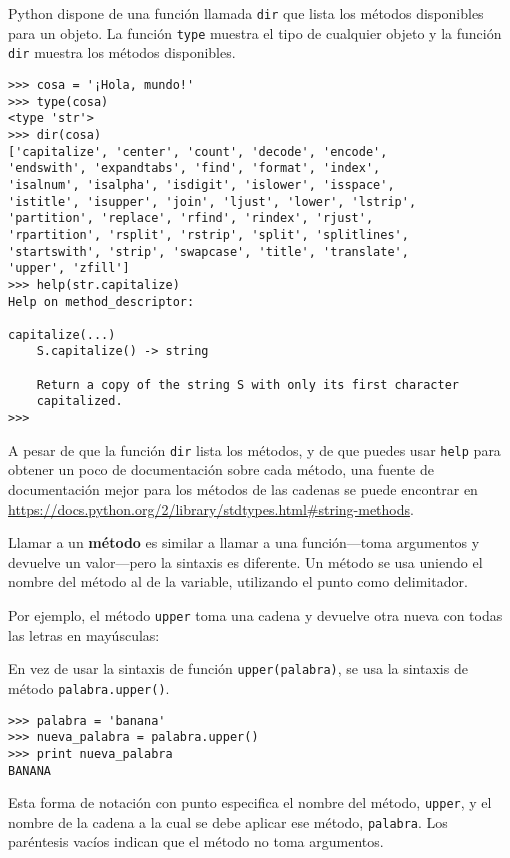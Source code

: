 Python dispone de una función llamada {\tt dir} que lista los métodos disponibles
para un objeto. La función {\tt type} muestra el tipo de cualquier objeto
y la función {\tt dir} muestra los métodos disponibles. 

\beforeverb
\begin{verbatim}
>>> cosa = '¡Hola, mundo!'
>>> type(cosa)
<type 'str'>
>>> dir(cosa)
['capitalize', 'center', 'count', 'decode', 'encode', 
'endswith', 'expandtabs', 'find', 'format', 'index', 
'isalnum', 'isalpha', 'isdigit', 'islower', 'isspace', 
'istitle', 'isupper', 'join', 'ljust', 'lower', 'lstrip', 
'partition', 'replace', 'rfind', 'rindex', 'rjust', 
'rpartition', 'rsplit', 'rstrip', 'split', 'splitlines', 
'startswith', 'strip', 'swapcase', 'title', 'translate', 
'upper', 'zfill']
>>> help(str.capitalize)
Help on method_descriptor:

capitalize(...)
    S.capitalize() -> string
    
    Return a copy of the string S with only its first character
    capitalized.
>>>
\end{verbatim}
\afterverb
%

A pesar de que la función {\tt dir} lista los métodos, y de que
puedes usar {\tt help} para obtener un poco de documentación sobre
cada método, una fuente de documentación mejor para los métodos de las cadenas
se puede encontrar en
\url{https://docs.python.org/2/library/stdtypes.html#string-methods}.

Llamar a un {\bf método} es similar a llamar a una función---toma
argumentos y devuelve un valor---pero la sintaxis es diferente.
Un método se usa uniendo el nombre del método al de la variable,
utilizando el punto como delimitador.

Por ejemplo, el
método {\tt upper} toma una cadena y devuelve otra nueva con todas
las letras en mayúsculas:


En vez de usar la sintaxis de función {\tt upper(palabra)}, se usa
la sintaxis de método {\tt palabra.upper()}.


\beforeverb
\begin{verbatim}
>>> palabra = 'banana'
>>> nueva_palabra = palabra.upper()
>>> print nueva_palabra
BANANA
\end{verbatim}
\afterverb
%
Esta forma de notación con punto especifica el nombre del método,
{\tt upper}, y el nombre de la cadena a la cual se debe aplicar ese método,
{\tt palabra}. Los paréntesis vacíos indican que el método no toma
argumentos.

